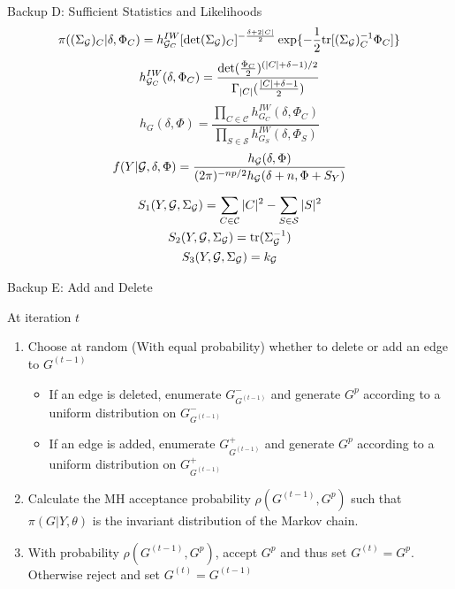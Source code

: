 \begin{frame}{Backup D: Sufficient Statistics and Likelihoods}
\begin{equation*}
    \pi((\Sigma_{\mathcal{G}})_C | \delta, \Phi_C) = h_{\mathcal{G}_C}^{IW} [\det (\Sigma_{\mathcal{G}})_C]^{-\frac{\delta+2|C|}{2}}\exp\{-\frac{1}{2}\text{tr}[(\Sigma_{\mathcal{G}})_C^{-1} \Phi_C]\}
\end{equation*}
\begin{equation*}
    h_{\mathcal{G}_C}^{IW}(\delta, \Phi_C) = \frac{\det(\frac{\Phi_C}{2})^{(|C|+\delta-1)/2}}{\Gamma_{|C|}(\frac{|C| +\delta - 1}{2})}
\end{equation*}
\begin{equation*}
    h_G(\delta,\Phi) = \frac{\prod_{C\in \mathcal{C}}h_{G _C}^{IW} (\delta, \Phi_C)}{\prod_{S\in \mathcal{S}}h_{G_S}^{IW} (\delta, \Phi_S)}
\end{equation*}
\begin{equation}\label{margData}
    f(Y|\mathcal{G}, \delta,\Phi) = \frac{h_{\mathcal{G}}(\delta, \Phi)}{(2\pi)^{-np/2}h_{\mathcal{G}} (\delta+n, \Phi + S_Y)}
\end{equation}

    \begin{equation}
    \begin{gathered}
        S_1(Y, \mathcal{G} , \Sigma_{\mathcal{G}}) = \sum_{C\in\mathcal{C}} |C|^2 - \sum_{S\in\mathcal{S}}|S|^2\\
        S_2(Y, \mathcal{G} , \Sigma_{\mathcal{G}}) = \text{tr}(\Sigma_{\mathcal{G}}^{-1})\\
        S_3(Y, \mathcal{G} , \Sigma_{\mathcal{G}}) = k_{\mathcal{G}}
    \end{gathered}
\end{equation}
\end{frame}

\begin{frame}{Backup E: Add and Delete}
    \begin{algorithm}[H]
    \caption{Add and delete MH proposal}\label{alg:add-delete-mh}
    At iteration $t$
    \begin{enumerate}
        \item Choose at random (With equal probability) whether to delete or add an edge to $G^{(t-1)}$
        \begin{itemize}
            \item If an edge is deleted, enumerate $G_{G^{(t-1)}}^{-}$ and generate $G^p$ according to a uniform distribution on $G_{G^{(t-1)}}^{-}$
            \item If an edge is added, enumerate $G_{G^{(t-1)}}^{+}$ and generate $G^p$ according to a uniform distribution on $G_{G^{(t-1)}}^{+}$
        \end{itemize}
        \item Calculate the MH acceptance probability $\rho(G^{(t-1)}, G^p)$ such that $\pi(G| Y, \theta)$ is the invariant distribution of the Markov chain.
        \item With probability $\rho(G^{(t-1)}, G^p)$, accept $G^p$ and thus set $G^{(t)} = G^p$. Otherwise reject and set $G^{(t)} = G^{(t-1)}$
    \end{enumerate}
\end{algorithm}
\end{frame}

